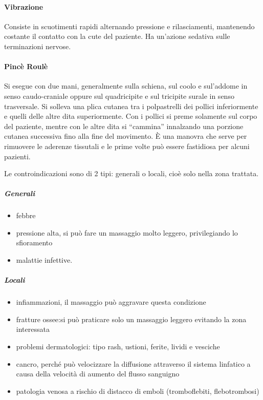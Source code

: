 \paragraph{Vibrazione}

Consiste in scuotimenti rapidi alternando pressione e rilasciamenti,
mantenendo costante il contatto con la cute del paziente. Ha un'azione
sedativa sulle terminazioni nervose.

\paragraph{Pincè Roulè}


Si esegue con due mani, generalmente sulla schiena, sul coolo e
sul'addome in senso caudo-craniale oppure sul quadricipite e sul
tricipite surale in senso trasversale. Si solleva una plica cutanea tra
i polpastrelli dei pollici inferiormente e quelli delle altre dita
superiormente. Con i pollici si preme solamente sul corpo del paziente,
mentre con le altre dita si ``cammina'' innalzando una porzione cutanea
successiva fino alla fine del movimento. È una manovra che serve per
rimuovere le aderenze tissutali e le prime volte può essere fastidiosa
per alcuni pazienti.

Le controindicazioni sono di 2 tipi: generali o locali, cioè solo nella
zona trattata.

\subparagraph{Generali}


\begin{itemize}
\item
  febbre
\item
  pressione alta, si può fare un massaggio molto leggero, privilegiando
  lo sfioramento
\item
  malattie infettive.
\end{itemize}

\subparagraph{Locali}


\begin{itemize}
\item
  infiammazioni, il massaggio può aggravare questa condizione
\item
  fratture ossee:si può praticare solo un massaggio leggero evitando la
  zona interessata
\item
  problemi dermatologici: tipo rash, ustioni, ferite, lividi e vesciche
\item
  cancro, perché può velocizzare la diffusione attraverso il sistema
  linfatico a causa della velocità di aumento del flusso sanguigno
\item
  patologia venosa a rischio di distacco di emboli (tromboflebiti,
  flebotrombosi)
\end{itemize}

